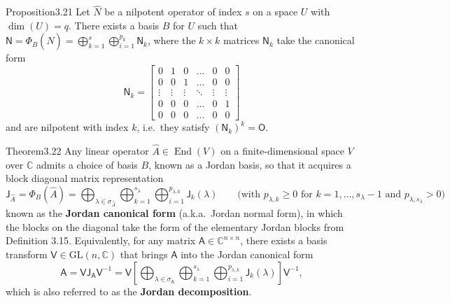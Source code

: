 \begin{res}{Proposition}{3.21}
Let $\hat N$ be a nilpotent operator of index $s$ on a space $U$ with $\dim(U)=q$. There exists a basis $B$ for $U$ such that $\mathsf N=\Phi_B(\hat N)=\bigoplus_{k=1}^s\bigoplus_{i=1}^{p_k}\mathsf N_k$, where the $k\times k$ matrices $\mathsf N_k$ take the canonical form
\begin{equation}\mathsf N_k=\begin{bmatrix}0&1&0&\ldots&0&0\\0&0&1&\ldots&0&0\\\vdots&\vdots&\vdots&\ddots&\vdots&\vdots\\0&0&0&\ldots&0&1\\0&0&0&\ldots&0&0\end{bmatrix}\tag{3.52}\end{equation}
and are nilpotent with index $k$, i.e.\ they satisfy $(\mathsf N_k)^k=\mathsf O$.
\end{res}

\begin{res}{Theorem}{3.22}
Any linear operator $\hat A\in\operatorname{End}(V)$ on a finite-dimensional space $V$ over $\mathbb C$ admits a choice of basis $B$, known as a Jordan basis, so that it acquires a block diagonal matrix representation
\begin{equation}\mathsf J_{\hat A}=\Phi_B(\hat A)=\bigoplus_{\lambda\in\sigma_{\hat A}}\bigoplus_{k=1}^{s_\lambda}\bigoplus_{i=1}^{p_{\lambda,k}}\mathsf J_k(\lambda)\qquad\text{(with $p_{\lambda,k}\ge0$ for $k=1,\dots,s_\lambda-1$ and $p_{\lambda,s_\lambda}>0$)}\tag{3.56}\end{equation}
known as the \textbf{Jordan canonical form} (a.k.a.\ Jordan normal form), in which the blocks on the diagonal take the form of the elementary Jordan blocks from Definition 3.15. Equivalently, for any matrix $\mathsf A\in\mathbb C^{n\times n}$, there exists a basis transform $\mathsf V\in\mathrm{GL}(n,\mathbb C)$ that brings $\mathsf A$ into the Jordan canonical form
\begin{equation}\mathsf A=\mathsf V\mathsf J_{\mathsf A}\mathsf V^{-1}=\mathsf V\left[\bigoplus_{\lambda\in\sigma_{\mathsf A}}\bigoplus_{k=1}^{s_\lambda}\bigoplus_{i=1}^{p_{\lambda,k}}\mathsf J_k(\lambda)\right]\mathsf V^{-1},\tag{3.57}\end{equation}
which is also referred to as the \textbf{Jordan decomposition}.
\end{res}

